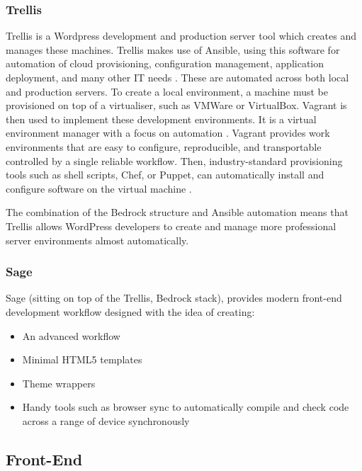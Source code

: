 \documentclass[fontsize=11pt]{extarticle}
\numberwithin{figure}{section} %
\providecommand{\tightlist}{%
  \setlength{\itemsep}{0pt}\setlength{\parskip}{0pt}}
\begin{document}
\hypertarget{trellis}{%
\subsubsection{Trellis}\label{trellis}}

Trellis is a Wordpress development and production server tool which
creates and manages these machines. Trellis makes use of Ansible, using
this software for automation of cloud provisioning, configuration
management, application deployment, and many other IT needs \cite{p12}.
These are automated across both local and production servers. To create
a local environment, a machine must be provisioned on top of a
virtualiser, such as VMWare or VirtualBox. Vagrant is then used to
implement these development environments. It is a virtual environment
manager with a focus on automation \cite{p10}. Vagrant provides work
environments that are easy to configure, reproducible, and transportable
controlled by a single reliable workflow. Then, industry-standard
provisioning tools such as shell scripts, Chef, or Puppet, can
automatically install and configure software on the virtual machine
\cite{p10}.

The combination of the Bedrock structure and Ansible automation means
that Trellis allows WordPress developers to create and manage more
professional server environments almost automatically.

\hypertarget{sage}{%
\subsubsection{Sage}\label{sage}}

Sage (sitting on top of the Trellis, Bedrock stack), provides modern
front-end development workflow designed with the idea of creating:

\begin{itemize}
\tightlist
\item
  An advanced workflow
\item
  Minimal HTML5 templates
\item
  Theme wrappers
\item
  Handy tools such as browser sync to automatically compile and check
  code across a range of device synchronously
\end{itemize}

\hypertarget{front-end}{%
\subsection{Front-End}\label{front-end}}
\end{document}
